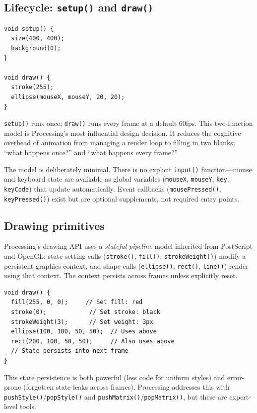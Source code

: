 \documentclass[10pt,letterpaper,twocolumn]{article}
\begin{document}
\subsection{Lifecycle: \texttt{setup()} and \texttt{draw()}}

\begin{lstlisting}[style=processingstyle,caption={Minimal Processing sketch.}]
void setup() {
  size(400, 400);
  background(0);
}

void draw() {
  stroke(255);
  ellipse(mouseX, mouseY, 20, 20);
}
\end{lstlisting}

\texttt{setup()} runs once; \texttt{draw()} runs every frame at a default 60fps. This two-function model is Processing's most influential design decision. It reduces the cognitive overhead of animation from managing a render loop to filling in two blanks: ``what happens once?'' and ``what happens every frame?''

The model is deliberately minimal. There is no explicit \texttt{input()} function---mouse and keyboard state are available as global variables (\texttt{mouseX}, \texttt{mouseY}, \texttt{key}, \texttt{keyCode}) that update automatically. Event callbacks (\texttt{mousePressed()}, \texttt{keyPressed()}) exist but are optional supplements, not required entry points.

\subsection{Drawing primitives}

Processing's drawing API uses a \emph{stateful pipeline} model inherited from PostScript and OpenGL: state-setting calls (\texttt{stroke()}, \texttt{fill()}, \texttt{strokeWeight()}) modify a persistent graphics context, and shape calls (\texttt{ellipse()}, \texttt{rect()}, \texttt{line()}) render using that context. The context persists across frames unless explicitly reset.

\begin{lstlisting}[style=processingstyle,caption={Stateful drawing context.}]
void draw() {
  fill(255, 0, 0);     // Set fill: red
  stroke(0);            // Set stroke: black
  strokeWeight(3);      // Set weight: 3px
  ellipse(100, 100, 50, 50);  // Uses above
  rect(200, 100, 50, 50);     // Also uses above
  // State persists into next frame
}
\end{lstlisting}

This state persistence is both powerful (less code for uniform styles) and error-prone (forgotten state leaks across frames). Processing addresses this with \texttt{pushStyle()}/\texttt{popStyle()} and \texttt{pushMatrix()}/\texttt{popMatrix()}, but these are expert-level tools.
\end{document}
